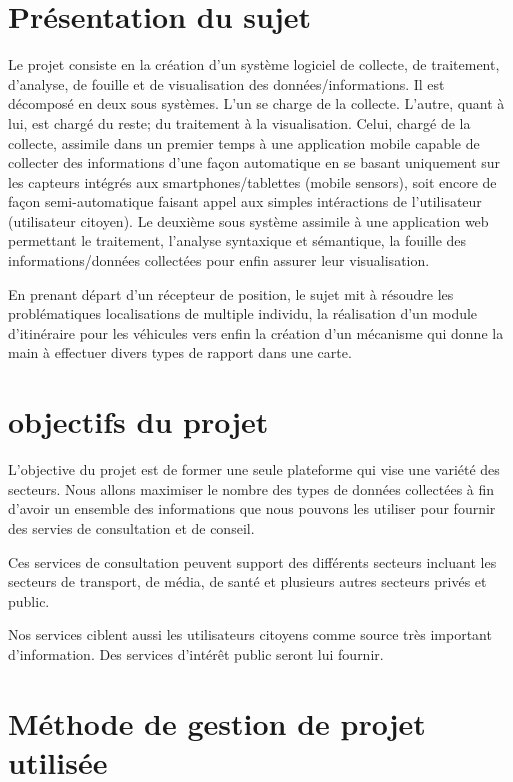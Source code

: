 \section{Présentation du sujet}

Le projet consiste en la création d'un système logiciel de collecte, de
traitement, d'analyse, de fouille et de visualisation des données/informations.
Il est décomposé en deux sous systèmes. L'un se charge de la collecte. L'autre,
quant à lui, est chargé du reste; du traitement à la visualisation.
Celui, chargé de la collecte, assimile dans un premier temps à une application
mobile capable de collecter des informations d'une façon automatique en se
basant uniquement sur les capteurs intégrés aux smartphones/tablettes
(mobile sensors), soit encore de façon semi-automatique faisant appel aux
simples intéractions de l'utilisateur (utilisateur citoyen).
Le deuxième sous système assimile à une application web permettant le
traitement, l'analyse syntaxique et sémantique, la fouille des
informations/données collectées pour enfin assurer leur visualisation.

En prenant départ d'un récepteur de position, le sujet mit à résoudre les
problématiques localisations de multiple individu, la réalisation d'un module
d'itinéraire pour les véhicules vers enfin la création d'un mécanisme qui donne
la main à effectuer divers types de rapport dans une carte.

\section{objectifs du projet}

L'objective du projet est de former une seule plateforme qui vise une variété
des secteurs. Nous allons maximiser le nombre des types de données collectées à
fin d'avoir un ensemble des informations que nous pouvons les utiliser pour
fournir des servies de consultation et de conseil.

Ces services de consultation peuvent support des différents secteurs incluant
les secteurs de transport, de média, de santé et plusieurs autres secteurs
privés et public.

Nos services ciblent aussi les utilisateurs citoyens comme source très
important d'information. Des services d'intérêt public seront lui fournir.

\section{Méthode de gestion de projet utilisée}

